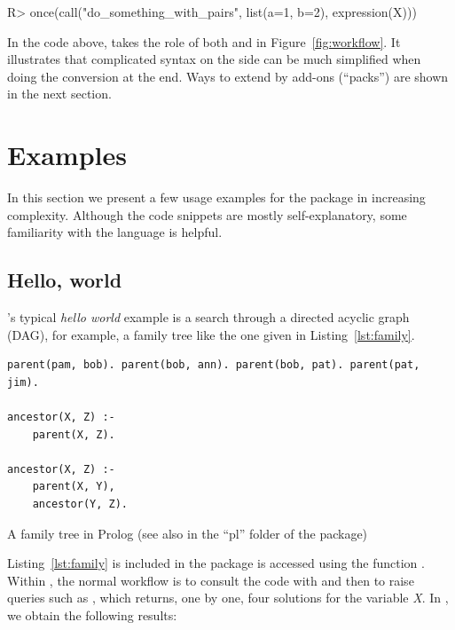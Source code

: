 \documentclass[article]{jss}
\begin{document}
\begin{Schunk}
\begin{Sinput}
R> once(call("do_something_with_pairs", list(a=1, b=2), expression(X)))
\end{Sinput}
\end{Schunk}

In the code above,  takes the role of both 
and  in Figure~\ref{fig:workflow}. It illustrates that
complicated syntax on the  side can be much simplified when doing
the conversion at the  end. Ways to extend  by
add-ons (``packs'') are shown in the next section.

\section{Examples}
\label{sec:examples}

In this section we present a few usage examples for the  package in
increasing complexity. Although the code snippets are mostly self-explanatory,
some familiarity with the  language is helpful.

\subsection{Hello, world}

's typical \emph{hello world} example is a search through a
directed acyclic graph (DAG), for example, a family tree like the one given in
Listing~\ref{lst:family}.

\begin{listing}
\begin{verbatim}
parent(pam, bob). parent(bob, ann). parent(bob, pat). parent(pat, jim).

ancestor(X, Z) :-
    parent(X, Z).

ancestor(X, Z) :-
    parent(X, Y),
    ancestor(Y, Z).
\end{verbatim}
\caption{A family tree in Prolog (see also  in the 
  ``pl'' folder of the package)}
\label{lst:family}
\end{listing}

Listing~\ref{lst:family} is included in the package is accessed using the
function . Within , the normal workflow
is to consult the code with \code{[family]} and then to raise queries such
as , which returns, one by one, four solutions for the
variable \emph{X}. In , we obtain the following results:
\end{document}
